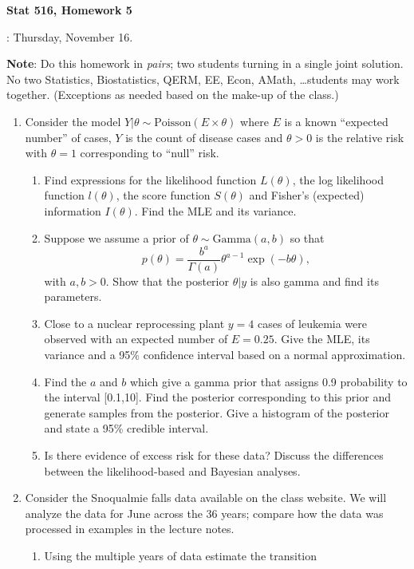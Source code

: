 \documentclass{article} %
\newcommand{\sectionname}[1]{\vspace{0.5cm} \noindent {\bf #1}}
\begin{document}
\begin{center}
  \textbf{\large Stat 516, Homework 5}
\end{center}
\sectionname{Due date}:  Thursday, November 16.

\noindent
\noindent
{\bf Note}: Do this homework in \emph{pairs}; two students turning in
a single joint solution.  No two Statistics, Biostatistics, QERM, EE,
Econ, AMath, \dots students may work together.  (Exceptions as needed based on the make-up of the class.)

\begin{enumerate}
\item Consider the model $Y | \theta \sim \mbox{Poisson}(E \times \theta)$ where $E$ is a known ``expected number'' of cases, $Y$ is the count of disease cases and $\theta >0$ is the relative risk with $\theta=1$ corresponding to ``null'' risk.
\begin{enumerate}
\item Find expressions for the likelihood function $L(\theta)$, the log
  likelihood function $l(\theta)$, the score function $S(\theta)$ and
  Fisher's (expected) information $I(\theta)$.  Find the MLE and its variance.
\item Suppose we assume a prior of $\theta \sim \mbox{Gamma}(a,b)$ so that
$$p(\theta) = \frac{b^a}{\Gamma(a)}\theta^{a-1} \exp( - b \theta),$$
with $a,b>0$. Show that the posterior $\theta | y$ is also gamma and
find its parameters.
\item Close to a nuclear reprocessing plant 
  $y=4$ cases of
  leukemia were observed with an expected number of $E=0.25$.
  Give the MLE, its variance and a 95\%
  confidence interval based on a normal approximation.  
\item Find the $a$ and $b$ which give a gamma prior that assigns 0.9
  probability to the interval [0.1,10].
Find the posterior corresponding to this prior and generate samples from the posterior. Give a histogram of the posterior and state a 95\% credible interval.
\item Is there evidence of excess risk for these data? Discuss the differences between the likelihood-based and Bayesian analyses.
\end{enumerate}
\item Consider the Snoqualmie falls data available on the class
  website. 
  We will analyze the
  data for June across the 36 years; compare how the data was
  processed in examples in the lecture notes.
\begin{enumerate}
\item Using the multiple years of data estimate the transition

\end{enumerate}
\end{enumerate}
\end{document}
